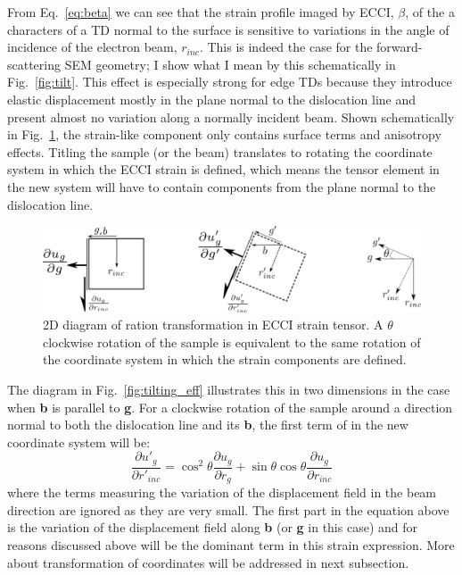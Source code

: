From Eq.~\ref{eq:beta} we can see that the strain profile imaged by ECCI, $\beta$,  of the a characters of a TD normal to the surface is sensitive to variations in the angle of incidence of the electron beam, $r_{inc}$. This is indeed the case for the forward-scattering SEM geometry; I show what I mean by this schematically in Fig.~\ref{fig:tilt}. This effect is especially strong for edge TDs because they introduce elastic displacement mostly in the plane normal to the dislocation line and present almost no variation along a normally incident beam. Shown schematically in Fig.~\ref{fig:tilting}, the strain-like component only contains surface terms and anisotropy effects. Titling the sample (or the beam) translates to rotating the coordinate system in which the ECCI strain is defined, which means the tensor element in the new system will have to contain components from the plane normal to the dislocation line.

\begin{figure}[ht]
    \centering
    \includegraphics[width=0.9\linewidth]{Figures/tilting.png}
    \caption[Rotation transformation of sample tilting.]{2D diagram of ration transformation in ECCI strain tensor. A $\theta$ clockwise rotation of the sample is equivalent to the same rotation of the coordinate system in which the strain components are defined. }
    \label{fig:tilting}
\end{figure}


The diagram in Fig.~\ref{fig:tilting_eff} illustrates this in two dimensions in the case when \textbf{b} is parallel to\textbf{ g}. For a clockwise rotation of the sample around a direction normal to both the dislocation line and its \textbf{b}, the first term of in the new coordinate system will be:
\begin{equation*}
    \frac{\partial u'_g}{\partial r'_{inc}} = \cos^2{\theta}  \frac{\partial u_g}{\partial r_{g}} + \sin{\theta} \cos{\theta}  \frac{\partial u_g}{\partial r_{inc}}
\end{equation*}
where the terms measuring the variation of the displacement field in the beam direction are ignored as they are
very small. The first part in the equation above is the variation of the displacement field along \textbf{b} (or \textbf{g} in this case) and for reasons discussed above will be the dominant term in this strain expression. More about transformation of coordinates will be addressed in next subsection.




